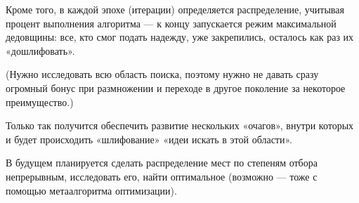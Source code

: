Кроме того, в каждой эпохе (итерации) определяется распределение, учитывая процент выполнения алгоритма
— к концу запускается режим максимальной дедовщины: все, кто смог подать надежду, уже закрепились, осталось как раз их «дошлифовать».

(Нужно исследовать всю область поиска,
поэтому нужно не давать сразу огромный бонус при размножении и переходе в другое поколение за некоторое преимущество.)

Только так получится обеспечить развитие нескольких «очагов», внутри которых и будет происходить «шлифование» «идеи искать в этой области».

В будущем планируется сделать распределение мест по степеням отбора непрерывным,
исследовать его, найти оптимальное (возможно — тоже с помощью метаалгоритма оптимизации).


